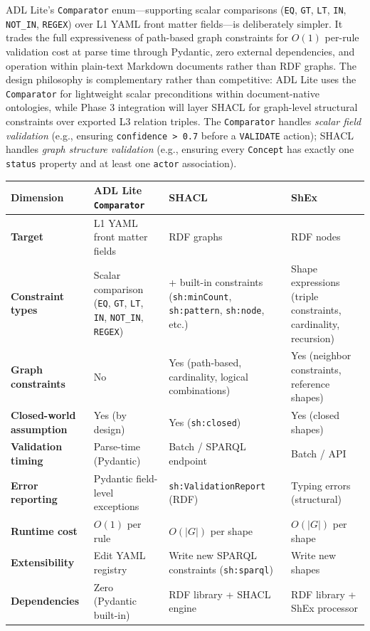 ADL Lite's \texttt{Comparator} enum---supporting scalar comparisons (\texttt{EQ}, \texttt{GT}, \texttt{LT}, \texttt{IN}, \texttt{NOT\_IN}, \texttt{REGEX}) over L1 YAML front matter fields---is deliberately simpler. It trades the full expressiveness of path-based graph constraints for \(O(1)\) per-rule validation cost at parse time through Pydantic, zero external dependencies, and operation within plain-text Markdown documents rather than RDF graphs. The design philosophy is complementary rather than competitive: ADL Lite uses the \texttt{Comparator} for lightweight scalar preconditions within document-native ontologies, while Phase 3 integration will layer SHACL for graph-level structural constraints over exported L3 relation triples. The \texttt{Comparator} handles \emph{scalar field validation} (e.g., ensuring \texttt{confidence\ \textgreater{}\ 0.7} before a \texttt{VALIDATE} action); SHACL handles \emph{graph structure validation} (e.g., ensuring every \texttt{Concept} has exactly one \texttt{status} property and at least one \texttt{actor} association).

\begin{longtable}[]{@{}>{\raggedright\arraybackslash}p{}
  >{\raggedright\arraybackslash}p{}
  >{\raggedright\arraybackslash}p{}
  >{\raggedright\arraybackslash}p{}@{}}
\toprule
Dimension
& ADL Lite \texttt{Comparator}
& SHACL
& ShEx
\\
\midrule
\endhead
\bottomrule
\endlastfoot
\textbf{Target} & L1 YAML front matter fields & RDF graphs & RDF nodes \\
\textbf{Constraint types} & Scalar comparison (\texttt{EQ}, \texttt{GT}, \texttt{LT}, \texttt{IN}, \texttt{NOT\_IN}, \texttt{REGEX}) & 50+ built-in constraints (\texttt{sh:minCount}, \texttt{sh:pattern}, \texttt{sh:node}, etc.) & Shape expressions (triple constraints, cardinality, recursion) \\
\textbf{Graph constraints} & No & Yes (path-based, cardinality, logical combinations) & Yes (neighbor constraints, reference shapes) \\
\textbf{Closed-world assumption} & Yes (by design) & Yes (\texttt{sh:closed}) & Yes (closed shapes) \\
\textbf{Validation timing} & Parse-time (Pydantic) & Batch / SPARQL endpoint & Batch / API \\
\textbf{Error reporting} & Pydantic field-level exceptions & \texttt{sh:ValidationReport} (RDF) & Typing errors (structural) \\
\textbf{Runtime cost} & \(O(1)\) per rule & \(O(|G|)\) per shape & \(O(|G|)\) per shape \\
\textbf{Extensibility} & Edit YAML registry & Write new SPARQL constraints (\texttt{sh:sparql}) & Write new shapes \\
\textbf{Dependencies} & Zero (Pydantic built-in) & RDF library + SHACL engine & RDF library + ShEx processor \\
\end{longtable}

